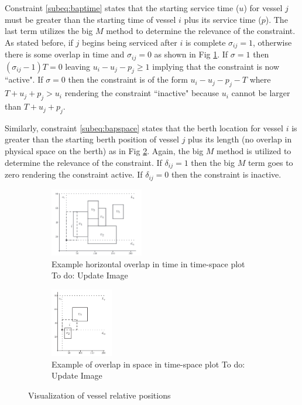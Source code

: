 \documentclass[letterpaper, 10pt, conference]{IEEEtran}
\newcommand{\TODO}[1]{{\color{green} To do: #1}} %
\begin{document}
Constraint \ref{subeq:baptime} states that the starting service time (\(u\)) for vessel \(j\) must be greater than the starting time of vessel \(i\) plus its service time (\(p\)). The last term utilizes the big \(M\) method to determine the relevance of the constraint. As stated before, if \(j\) begins being serviced after \(i\) is complete \(\sigma_{ij} = 1\), otherwise there is some overlap in time and \(\sigma_{ij} = 0\) as shown in Fig \ref{subfig:timeoverlap}. If \(\sigma = 1\) then \((\sigma_{ij} - 1)T = 0\) leaving \(u_i - u_j - p_j \geq 1\) implying that the constraint is now ``active". If \(\sigma = 0\) then the constraint is of the form \(u_i - u_j - p_j - T\) where \(T + u_j + p_j > u_i\) rendering the constraint ``inactive" because \(u_i\) cannot be larger than \(T + u_j + p_j\).

Similarly, constraint \ref{subeq:bapspace} states that the berth location for vessel \(i\) is greater than the starting berth position of vessel \(j\) plus its length (no overlap in physical space on the berth) as in Fig \ref{subfig:spaceoverlap}. Again, the big \(M\) method is utilized to determine the relevance of the constraint. If \(\delta_{ij} = 1\) then the big \(M\) term goes to zero rendering the constraint active. If \(\delta_{ij} = 0\) then the constraint is inactive.

\begin{figure}
    \centering
    \begin{subfigure}[b]{0.2\textwidth}
        \centering
    	\includegraphics[height=3cm]{hoizontaloverlap.png}
    	\caption{Example horizontal overlap in time in time-space plot\TODO{Update Image}}
    	\label{subfig:timeoverlap}
	\end{subfigure}
	\hfill
    \begin{subfigure}[b]{0.2\textwidth}
        \centering
    	\includegraphics[height=3cm]{verticaloverlap.png}
    	\caption{Example of overlap in space in time-space plot\TODO{Update Image}}
    	\label{subfig:spaceoverlap}
	\end{subfigure}
	\caption{Visualization of vessel relative positions}
	\label{fig:overlap}
\end{figure}
\end{document}
